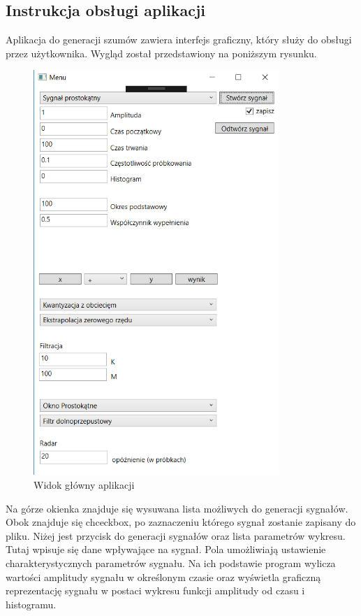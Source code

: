 \documentclass[12pt]{article}
\begin{document}

\subsection{Instrukcja obsługi aplikacji}
Aplikacja do generacji szumów zawiera interfejs graficzny, który służy do obsługi przez użytkownika. Wygląd został przedstawiony na poniższym rysunku.
\begin{figure}[h!]
 \centering
 \includegraphics[width=9.3cm]{ui1.PNG}
 \vspace{-0.3cm}
 \caption{Widok główny aplikacji}
 \label{Widok_aplikacjis}
\end{figure}

Na górze okienka znajduje się wysuwana lista możliwych do generacji sygnałów. Obok znajduje się chceckbox, po zaznaczeniu którego sygnał zostanie zapisany do pliku.
Niżej jest przycisk do generacji sygnałów oraz lista parametrów wykresu. Tutaj wpisuje się dane wpływające na sygnał.
Pola umożliwiają ustawienie charakterystycznych parametrów sygnału. Na ich podstawie program wylicza wartości amplitudy sygnału w określonym czasie oraz wyświetla graficzną reprezentację sygnału w postaci wykresu funkcji amplitudy od czasu i histogramu.\\
\end{document}
